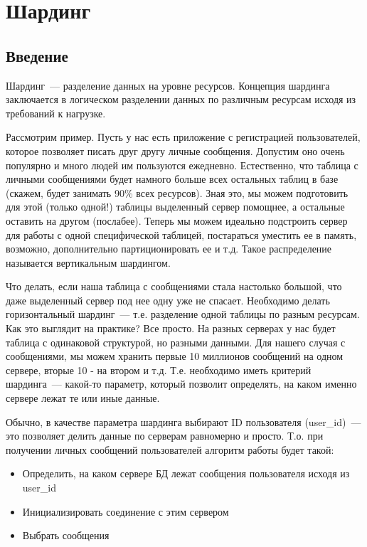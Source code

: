 \chapter{Шардинг}
\begin{epigraphs}
\end{epigraphs}
\section{Введение}
Шардинг~--- разделение данных на уровне ресурсов. Концепция шардинга заключается в логическом разделении данных по различным 
ресурсам исходя из требований к нагрузке.

Рассмотрим пример. Пусть у нас есть приложение с регистрацией пользователей, которое позволяет писать друг другу 
личные сообщения. Допустим оно очень популярно и много людей им пользуются ежедневно. Естественно, что таблица с личными 
сообщениями будет намного больше всех остальных таблиц в базе (скажем, будет занимать 90\% всех ресурсов). Зная это, 
мы можем подготовить для этой (только одной!) таблицы выделенный сервер помощнее, а остальные оставить на другом (послабее). 
Теперь мы можем идеально подстроить сервер для работы с одной специфической таблицей, постараться уместить ее в память, возможно, 
дополнительно партиционировать ее и т.д. Такое распределение называется вертикальным шардингом.

Что делать, если наша таблица с сообщениями стала настолько большой, что даже выделенный сервер под нее одну уже не спасает. 
Необходимо делать горизонтальный шардинг~--- т.е. разделение одной таблицы по разным ресурсам. Как это выглядит на практике? 
Все просто. На разных серверах у нас будет таблица с одинаковой структурой, но разными данными. Для нашего случая с сообщениями, 
мы можем хранить первые 10 миллионов сообщений на одном сервере, вторые 10 - на втором и т.д. Т.е. необходимо иметь критерий 
шардинга~--- какой-то параметр, который позволит определять, на каком именно сервере лежат те или иные данные.

Обычно, в качестве параметра шардинга выбирают ID пользователя (user\_id)~--- это позволяет делить данные по серверам равномерно 
и просто. Т.о. при получении личных сообщений пользователей алгоритм работы будет такой:
\begin{itemize}
\item Определить, на каком сервере БД лежат сообщения пользователя исходя из user\_id
\item Инициализировать соединение с этим сервером
\item Выбрать сообщения
\end{itemize}

